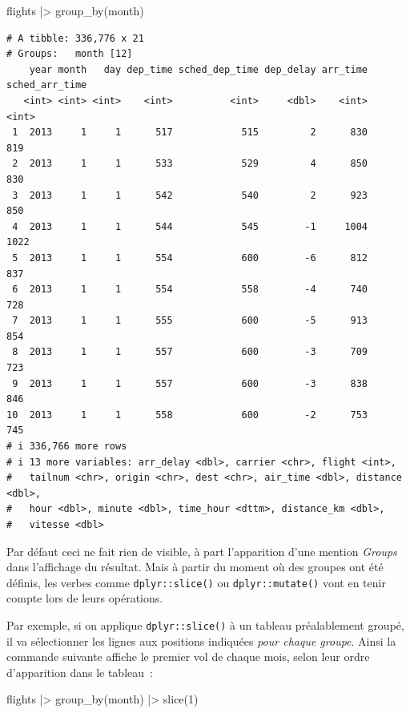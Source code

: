 \documentclass[
  letterpaper,
  DIV=11,
  numbers=noendperiod,
  oneside]{scrreprt}
\newenvironment{Shaded}{\begin{snugshade}}{\end{snugshade}}
\newcommand{\DecValTok}[1]{\textcolor[rgb]{0.68,0.00,0.00}{#1}}
\newcommand{\FunctionTok}[1]{\textcolor[rgb]{0.28,0.35,0.67}{#1}}
\newcommand{\NormalTok}[1]{\textcolor[rgb]{0.00,0.23,0.31}{#1}}
\newcommand{\SpecialCharTok}[1]{\textcolor[rgb]{0.37,0.37,0.37}{#1}}
\begin{document}
\begin{Shaded}
\begin{Highlighting}[]
\NormalTok{flights }\SpecialCharTok{|\textgreater{}} 
  \FunctionTok{group\_by}\NormalTok{(month)}
\end{Highlighting}
\end{Shaded}

\begin{verbatim}
# A tibble: 336,776 x 21
# Groups:   month [12]
    year month   day dep_time sched_dep_time dep_delay arr_time sched_arr_time
   <int> <int> <int>    <int>          <int>     <dbl>    <int>          <int>
 1  2013     1     1      517            515         2      830            819
 2  2013     1     1      533            529         4      850            830
 3  2013     1     1      542            540         2      923            850
 4  2013     1     1      544            545        -1     1004           1022
 5  2013     1     1      554            600        -6      812            837
 6  2013     1     1      554            558        -4      740            728
 7  2013     1     1      555            600        -5      913            854
 8  2013     1     1      557            600        -3      709            723
 9  2013     1     1      557            600        -3      838            846
10  2013     1     1      558            600        -2      753            745
# i 336,766 more rows
# i 13 more variables: arr_delay <dbl>, carrier <chr>, flight <int>,
#   tailnum <chr>, origin <chr>, dest <chr>, air_time <dbl>, distance <dbl>,
#   hour <dbl>, minute <dbl>, time_hour <dttm>, distance_km <dbl>,
#   vitesse <dbl>
\end{verbatim}

Par défaut ceci ne fait rien de visible, à part l'apparition d'une
mention \emph{Groups} dans l'affichage du résultat. Mais à partir du
moment où des groupes ont été définis, les verbes comme
\texttt{dplyr::slice()} ou \texttt{dplyr::mutate()} vont en tenir compte
lors de leurs opérations.

Par exemple, si on applique \texttt{dplyr::slice()} à un tableau
préalablement groupé, il va sélectionner les lignes aux positions
indiquées \emph{pour chaque groupe}. Ainsi la commande suivante affiche
le premier vol de chaque mois, selon leur ordre d'apparition dans le
tableau~:

\begin{Shaded}
\begin{Highlighting}[]
\NormalTok{flights }\SpecialCharTok{|\textgreater{}} 
  \FunctionTok{group\_by}\NormalTok{(month) }\SpecialCharTok{|\textgreater{}} 
  \FunctionTok{slice}\NormalTok{(}\DecValTok{1}\NormalTok{)}
\end{Highlighting}
\end{Shaded}
\end{document}
